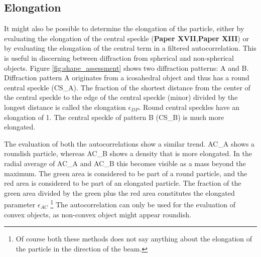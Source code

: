 \subsection{Elongation}

It might also be possible to determine the elongation of the particle, either by evaluating the elongation of the central speckle (\textbf{Paper XVII},\textbf{Paper XIII}) or by evaluating the elongation of the central term in a filtered autocorrelation. This is useful in discerning between diffraction from spherical and non-spherical objects. Figure \ref{fig:shape_assessment} shows two diffraction patterns: A and B. Diffraction pattern A originates from a icosahedral object and thus has a round central speckle (CS\_A). The fraction of the shortest distance from the center of the central speckle to the edge of the central speckle (minor) divided by the longest distance is called the elongation $\epsilon_{DP}$. Round central speckles have an elongation of 1. The central speckle of pattern B (CS\_B) is much more elongated. 

The evaluation of both the autocorrelations show a similar trend. AC\_A shows a roundish particle, whereas AC\_B shows a density that is more elongated. In the radial average of AC\_A and AC\_B this becomes visible as a mass beyond the maximum. The green area is considered to be part of a round particle, and the red area is considered to be part of an elongated particle. The fraction of the green area divided by the green plus the red area constitutes the elongated parameter $\epsilon_{AC}$ \footnote{Of course both these methods does not say anything about the elongation of the particle in the direction of the beam.
} The autocorrelation can only be used for the evaluation of convex objects, as non-convex object might appear roundish. 

